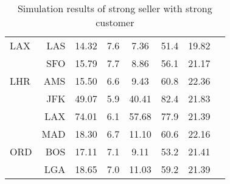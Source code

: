 \begin{table}[h]
\begin{center}
\begin{tabular}{l r c c c c c c}
LAX  &  LAS &   14.32  &     7.6  &    7.36  &    51.4  &   19.82  \\
     &  SFO &   15.79  &     7.7  &    8.86  &    56.1  &   21.17  \\[.5ex]
LHR  &  AMS &   15.50  &     6.6  &    9.43  &    60.8  &   22.36  \\
     &  JFK &   49.07  &     5.9  &   40.41  &    82.4  &   21.83  \\
     &  LAX &   74.01  &     6.1  &   57.68  &    77.9  &   21.39  \\
     &  MAD &   18.30  &     6.7  &   11.10  &    60.6  &   22.16  \\[.5ex]
ORD  &  BOS &   17.11  &     7.1  &    9.11  &    53.2  &   21.41  \\
     &  LGA &   18.65  &     7.0  &   11.03  &    59.2  &   21.39  \\
            \bottomrule
        \end{tabular}
        \caption{Simulation results of strong seller with strong customer}
        \label{tbl:resultsStrongStrong}
    \end{center}
\end{table}




